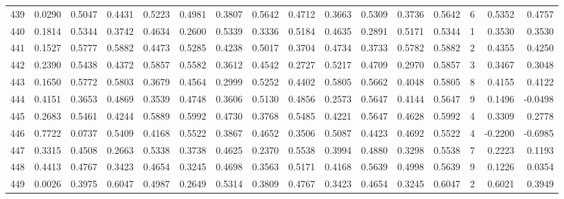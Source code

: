 \begin{tabular}{lrrrrrrrrrrrrrrr}
439 &      0.0290 &  0.5047 &  0.4431 &  0.5223 &  0.4981 &  0.3807 &  0.5642 &  0.4712 &  0.3663 &  0.5309 &   0.3736 &     0.5642 &      6 &                    0.5352 &                     0.4757 \\
440 &      0.1814 &  0.5344 &  0.3742 &  0.4634 &  0.2600 &  0.5339 &  0.3336 &  0.5184 &  0.4635 &  0.2891 &   0.5171 &     0.5344 &      1 &                    0.3530 &                     0.3530 \\
441 &      0.1527 &  0.5777 &  0.5882 &  0.4473 &  0.5285 &  0.4238 &  0.5017 &  0.3704 &  0.4734 &  0.3733 &   0.5782 &     0.5882 &      2 &                    0.4355 &                     0.4250 \\
442 &      0.2390 &  0.5438 &  0.4372 &  0.5857 &  0.5582 &  0.3612 &  0.4542 &  0.2727 &  0.5217 &  0.4709 &   0.2970 &     0.5857 &      3 &                    0.3467 &                     0.3048 \\
443 &      0.1650 &  0.5772 &  0.5803 &  0.3679 &  0.4564 &  0.2999 &  0.5252 &  0.4402 &  0.5805 &  0.5662 &   0.4048 &     0.5805 &      8 &                    0.4155 &                     0.4122 \\
444 &      0.4151 &  0.3653 &  0.4869 &  0.3539 &  0.4748 &  0.3606 &  0.5130 &  0.4856 &  0.2573 &  0.5647 &   0.4144 &     0.5647 &      9 &                    0.1496 &                    -0.0498 \\
445 &      0.2683 &  0.5461 &  0.4244 &  0.5889 &  0.5992 &  0.4730 &  0.3768 &  0.5485 &  0.4221 &  0.5647 &   0.4628 &     0.5992 &      4 &                    0.3309 &                     0.2778 \\
446 &      0.7722 &  0.0737 &  0.5409 &  0.4168 &  0.5522 &  0.3867 &  0.4652 &  0.3506 &  0.5087 &  0.4423 &   0.4692 &     0.5522 &      4 &                   -0.2200 &                    -0.6985 \\
447 &      0.3315 &  0.4508 &  0.2663 &  0.5338 &  0.3738 &  0.4625 &  0.2370 &  0.5538 &  0.3994 &  0.4880 &   0.3298 &     0.5538 &      7 &                    0.2223 &                     0.1193 \\
448 &      0.4413 &  0.4767 &  0.3423 &  0.4654 &  0.3245 &  0.4698 &  0.3563 &  0.5171 &  0.4168 &  0.5639 &   0.4998 &     0.5639 &      9 &                    0.1226 &                     0.0354 \\
449 &      0.0026 &  0.3975 &  0.6047 &  0.4987 &  0.2649 &  0.5314 &  0.3809 &  0.4767 &  0.3423 &  0.4654 &   0.3245 &     0.6047 &      2 &                    0.6021 &                     0.3949 \\

\end{tabular}
